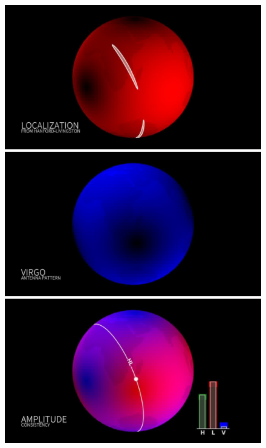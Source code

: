 \begin{figure}
\begin{minipage}{0.45\linewidth}
  \end{minipage}
  \hfill
  \begin{minipage}{0.45\linewidth}
    \centering
    \includegraphics[width=\linewidth]{sectionDetection/antenna-patterns_LeoSinger/00318.jpg}
  \end{minipage}
  \hfill
  \begin{minipage}{0.45\linewidth}
    \centering
    \includegraphics[width=\linewidth]{sectionDetection/antenna-patterns_LeoSinger/00418.jpg}
  \end{minipage}
  \hfill
  \begin{minipage}{0.45\linewidth}
    \centering
    \includegraphics[width=\linewidth]{sectionDetection/antenna-patterns_LeoSinger/00552.jpg}

\end{minipage}
\end{figure}
